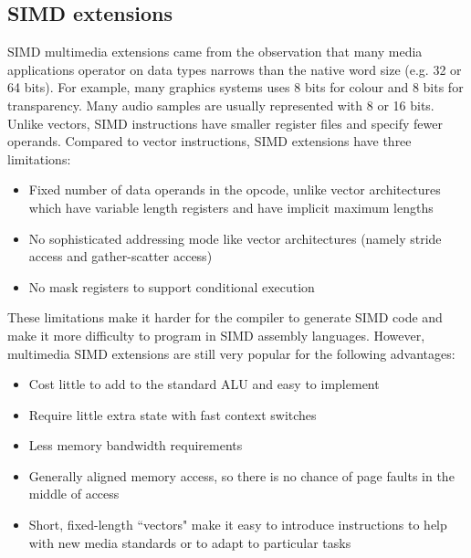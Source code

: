 \documentclass[11pt]{article}
\begin{document}
\subsection{SIMD extensions}
SIMD multimedia extensions came from the observation that many media applications operator on data types narrows than the native word size (e.g. 32 or 64 bits). For example, many graphics systems uses 8 bits for colour and 8 bits for transparency. Many audio samples are usually represented with 8 or 16 bits. Unlike vectors, SIMD instructions have smaller register files and specify fewer operands.
\n
Compared to vector instructions, SIMD extensions have three limitations:
\begin{itemize}
\item Fixed number of data operands in the opcode, unlike vector architectures which have variable length registers and have implicit maximum lengths
\item No sophisticated addressing mode like vector architectures (namely stride access and gather-scatter access)
\item No mask registers to support conditional execution
\end{itemize}
These limitations make it harder for the compiler to generate SIMD code and make it more difficulty to program in SIMD assembly languages. However, multimedia SIMD extensions are still very popular for the following advantages:
\begin{itemize}
\item Cost little to add to the standard ALU and easy to implement
\item Require little extra state with fast context switches
\item Less memory bandwidth requirements
\item Generally aligned memory access, so there is no chance of page faults in the middle of access
\item Short, fixed-length ``vectors" make it easy to introduce instructions to help with new media standards or to adapt to particular tasks
\end{itemize}
\end{document}
